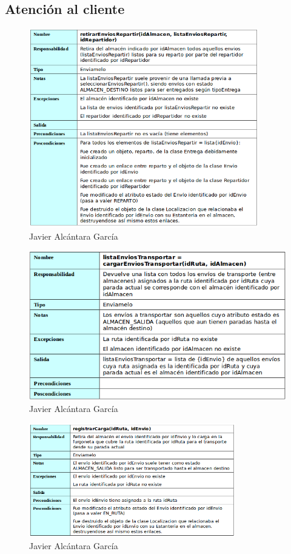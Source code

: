 \subsection{Atención al cliente}
\begin{figure}[H]
	\centering
	\includegraphics[width=10cm]{13}
	\caption{Javier Alcántara García}
\end{figure}
\begin{figure}[H]
	\centering
	\includegraphics[width=16cm]{14}
	\caption{Javier Alcántara García}
\end{figure}
\begin{figure}[H]
	\centering
	\includegraphics[width=9cm]{15}
	\caption{Javier Alcántara García}
\end{figure}
